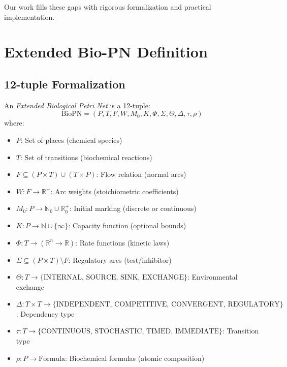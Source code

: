 \documentclass[runningheads]{llncs}
\begin{document}
Our work fills these gaps with rigorous formalization and practical implementation.

\section{Extended Bio-PN Definition}

\subsection{12-tuple Formalization}

\begin{definition}
An \emph{Extended Biological Petri Net} is a 12-tuple:
\begin{equation}
\text{BioPN} = (P, T, F, W, M_0, K, \Phi, \Sigma, \Theta, \Delta, \tau, \rho)
\end{equation}
where:
\begin{itemize}
    \item $P$: Set of places (chemical species)
    \item $T$: Set of transitions (biochemical reactions)
    \item $F \subseteq (P \times T) \cup (T \times P)$: Flow relation (normal arcs)
    \item $W: F \to \mathbb{R}^+$: Arc weights (stoichiometric coefficients)
    \item $M_0: P \to \mathbb{N}_0 \cup \mathbb{R}_0^+$: Initial marking (discrete or continuous)
    \item $K: P \to \mathbb{N} \cup \{\infty\}$: Capacity function (optional bounds)
    \item $\Phi: T \to (\mathbb{R}^n \to \mathbb{R})$: Rate functions (kinetic laws)
    \item $\Sigma \subseteq (P \times T) \setminus F$: Regulatory arcs (test/inhibitor)
    \item $\Theta: T \to \{\text{INTERNAL, SOURCE, SINK, EXCHANGE}\}$: Environmental exchange
    \item $\Delta: T \times T \to \{\text{INDEPENDENT, COMPETITIVE, CONVERGENT, REGULATORY}\}$: Dependency type
    \item $\tau: T \to \{\text{CONTINUOUS, STOCHASTIC, TIMED, IMMEDIATE}\}$: Transition type
    \item $\rho: P \to \text{Formula}$: Biochemical formulas (atomic composition)
\end{itemize}
\end{definition}
\end{document}
